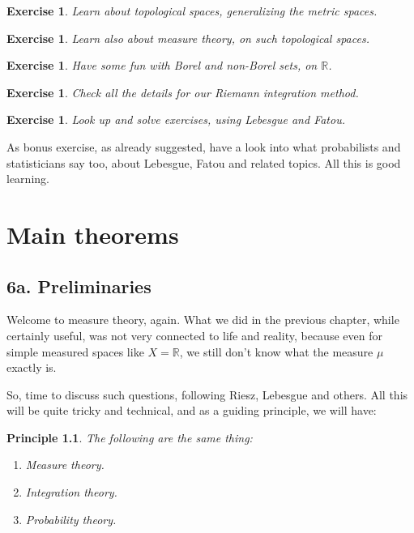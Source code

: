\documentclass[12pt]{amsbook}
\newtheorem{exercise}[theorem]{Exercise}
\newtheorem{principle}[theorem]{Principle}
\begin{document}
\begin{exercise}
Learn about topological spaces, generalizing the metric spaces.
\end{exercise}

\begin{exercise}
Learn also about measure theory, on such topological spaces.
\end{exercise}

\begin{exercise}
Have some fun with Borel and non-Borel sets, on $\mathbb R$.
\end{exercise}

\begin{exercise}
Check all the details for our Riemann integration method.
\end{exercise}

\begin{exercise}
Look up and solve exercises, using Lebesgue and Fatou.
\end{exercise}

As bonus exercise, as already suggested, have a look into what probabilists and statisticians say too, about Lebesgue, Fatou and related topics. All this is good learning.

\chapter{Main theorems}

\section*{6a. Preliminaries}

Welcome to measure theory, again. What we did in the previous chapter, while certainly useful, was not very connected to life and reality, because even for simple measured spaces like $X=\mathbb R$, we still don't know what the measure $\mu$ exactly is.

\bigskip

So, time to discuss such questions, following Riesz, Lebesgue and others. All this will be quite tricky and technical, and as a guiding principle, we will have:

\begin{principle}
The following are the same thing:
\begin{enumerate}
\item Measure theory.

\item Integration theory.

\item Probability theory.
\end{enumerate}
\end{principle}
\end{document}
